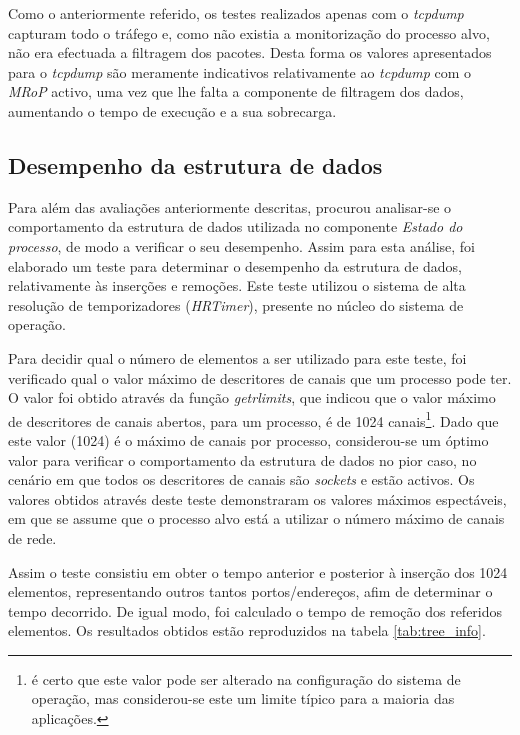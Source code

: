 Como o anteriormente referido, os testes realizados apenas com o \textit{tcpdump} capturam todo o tráfego e, como não existia a monitorização do processo alvo, não era efectuada a filtragem dos pacotes.
Desta forma os valores apresentados para o \textit{tcpdump} são meramente indicativos relativamente ao \textit{tcpdump} com o \textit{MRoP} activo, uma vez que lhe falta a componente de filtragem dos dados, aumentando o tempo de execução e a sua sobrecarga.

\subsection{Desempenho da estrutura de dados}

Para além das avaliações anteriormente descritas, procurou analisar-se o comportamento da estrutura de dados utilizada no componente \textit{Estado do processo}, de modo a verificar o seu desempenho.
Assim para esta análise, foi elaborado um teste para determinar o desempenho da estrutura de dados, relativamente às inserções e remoções.
Este teste utilizou o sistema de alta resolução de temporizadores (\textit{HRTimer})\cite{hrtimerKernel}, presente no núcleo do sistema de operação.

Para decidir qual o número de elementos a ser utilizado para este teste, foi verificado qual o valor máximo de descritores de canais que um processo pode ter.
O valor foi obtido através da função \textit{getrlimits}, que indicou que o valor máximo de descritores de canais abertos, para um processo, é de 1024 canais\footnote{é certo que este valor pode ser alterado na configuração do sistema de operação, mas considerou-se este um limite típico para a maioria das aplicações.}.
Dado que este valor (1024) é o máximo de canais por processo, considerou-se um óptimo valor para verificar o comportamento da estrutura de dados no pior caso, no cenário em que todos os descritores de canais são \textit{sockets} e estão activos.
Os valores obtidos através deste teste demonstraram os valores máximos espectáveis, em que se assume que o processo alvo está a utilizar o número máximo de canais de rede.

Assim o teste consistiu em obter o tempo anterior e posterior à inserção dos 1024 elementos, representando outros tantos portos/endereços, afim de determinar o tempo decorrido.
De igual modo, foi calculado o tempo de remoção dos referidos elementos.
Os resultados obtidos estão reproduzidos na tabela \ref{tab:tree_info}.
 
